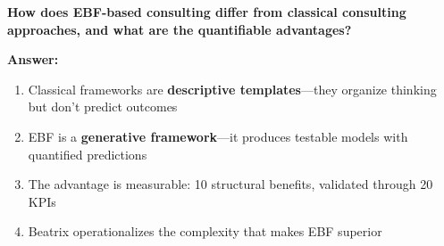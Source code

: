 \begin{tcolorbox}[colback=red!5!white, colframe=red!75!black,
    title=\textbf{Fundamental Question}]

\textbf{How does EBF-based consulting differ from classical consulting approaches,
and what are the quantifiable advantages?}

\vspace{0.5em}
\textbf{Answer:}
\begin{enumerate}[nosep]
    \item Classical frameworks are \textbf{descriptive templates}---they organize thinking but don't predict outcomes
    \item EBF is a \textbf{generative framework}---it produces testable models with quantified predictions
    \item The advantage is measurable: 10 structural benefits, validated through 20 KPIs
    \item Beatrix operationalizes the complexity that makes EBF superior
\end{enumerate}

\end{tcolorbox}




